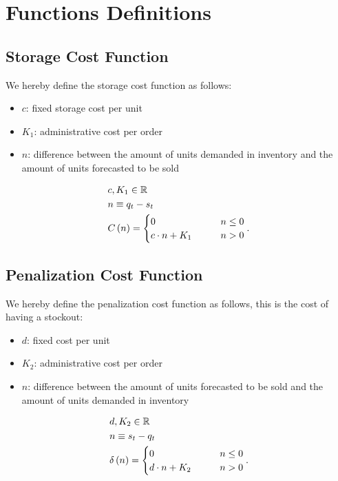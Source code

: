 \documentclass{OptiFlow}
\begin{document}
\section{Functions Definitions}
\subsection{Storage Cost Function}
We hereby define the storage cost function as follows:
\begin{itemize}
	\item $c$: fixed storage cost per unit
	\item $K_1$: administrative cost per order
	\item $n$: difference between the amount of units demanded in inventory and the amount of units forecasted to be sold
\end{itemize}

\begin{align*}
	&c, K_1 \in \mathbb{R}\\
	&n \equiv q_t - s_t\\
	&C\left( n \right) =  \begin{cases}
		0 \text{\qquad} &n \le  0\\
		c\cdot n +K_1 \text{\qquad} &n>0
	\end{cases}  
.\end{align*}

\subsection{Penalization Cost Function}
We hereby define the penalization cost function as follows, this is the cost of having a stockout:
\begin{itemize}
	\item $d$: fixed cost per unit
	\item $K_2$: administrative cost per order
	\item $n$: difference between the amount of units forecasted to be sold and the amount of units demanded in inventory
\end{itemize}

\begin{align*}
	&d,K_2 \in  \mathbb{R}\\
	&n \equiv s_t - q_t\\
	&\delta\left( n \right) = \begin{cases}
		0 \text{\qquad} &n \le  0\\
		d\cdot n + K_2 \text{\qquad} &n > 0
	\end{cases}
.\end{align*}
\end{document}
